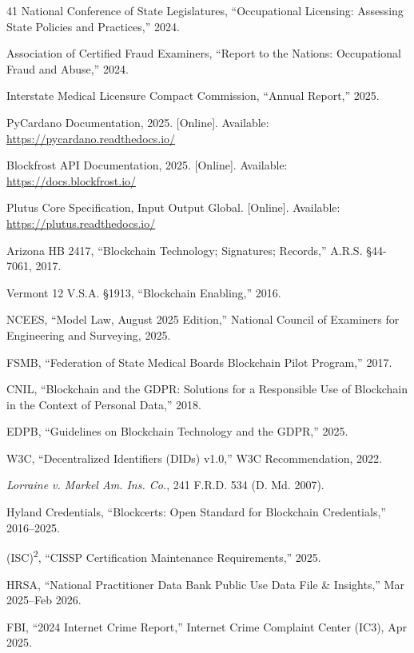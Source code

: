 \documentclass[conference,10pt]{IEEEtran}
\begin{document}
\begin{thebibliography}{41}
National Conference of State Legislatures, ``Occupational Licensing: Assessing State Policies and Practices,'' 2024.

Association of Certified Fraud Examiners, ``Report to the Nations: Occupational Fraud and Abuse,'' 2024.

Interstate Medical Licensure Compact Commission, ``Annual Report,'' 2025.

PyCardano Documentation, 2025. [Online]. Available: \url{https://pycardano.readthedocs.io/}

Blockfrost API Documentation, 2025. [Online]. Available: \url{https://docs.blockfrost.io/}

Plutus Core Specification, Input Output Global. [Online]. Available: \url{https://plutus.readthedocs.io/}

Arizona HB 2417, ``Blockchain Technology; Signatures; Records,'' A.R.S. \S44-7061, 2017.

Vermont 12 V.S.A. \S1913, ``Blockchain Enabling,'' 2016.

NCEES, ``Model Law, August 2025 Edition,'' National Council of Examiners for Engineering and Surveying, 2025.

FSMB, ``Federation of State Medical Boards Blockchain Pilot Program,'' 2017.

CNIL, ``Blockchain and the GDPR: Solutions for a Responsible Use of Blockchain in the Context of Personal Data,'' 2018.

EDPB, ``Guidelines on Blockchain Technology and the GDPR,'' 2025.

W3C, ``Decentralized Identifiers (DIDs) v1.0,'' W3C Recommendation, 2022.

\emph{Lorraine v. Markel Am. Ins. Co.}, 241 F.R.D. 534 (D. Md. 2007).

Hyland Credentials, ``Blockcerts: Open Standard for Blockchain Credentials,'' 2016--2025.

(ISC)\textsuperscript{2}, ``CISSP Certification Maintenance Requirements,'' 2025.

HRSA, ``National Practitioner Data Bank Public Use Data File \& Insights,'' Mar 2025--Feb 2026.

FBI, ``2024 Internet Crime Report,'' Internet Crime Complaint Center (IC3), Apr 2025.


\end{thebibliography}
\end{document}
